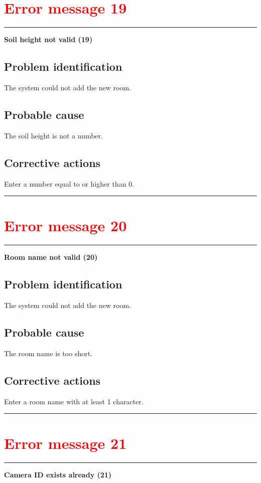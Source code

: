 \section{\textbf{\textcolor{red}{Error message 19}}}
\hrule
\vspace{0.5cm}
\textbf{Soil height not valid (19)}
\subsection{Problem identification}
The system could not add the new room.

\subsection{Probable cause}
The soil height is not a number.

\subsection{Corrective actions}
Enter a number equal to or higher than 0.
\vspace{0.5cm}
\hrule
\hfill




\section{\textbf{\textcolor{red}{Error message 20}}}
\hrule
\vspace{0.5cm}
\textbf{Room name not valid (20)}
\subsection{Problem identification}
The system could not add the new room.

\subsection{Probable cause}
The room name is too short.

\subsection{Corrective actions}
Enter a room name with at least 1 character.
\vspace{0.5cm}
\hrule
\hfill




\section{\textbf{\textcolor{red}{Error message 21}}}
\hrule
\vspace{0.5cm}
\textbf{Camera ID exists already (21)}
